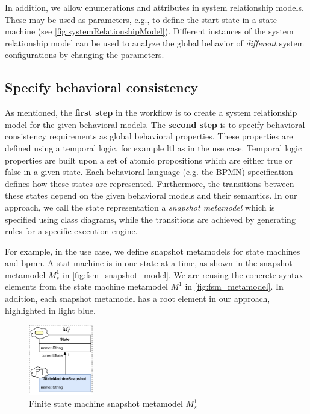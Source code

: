 \documentclass{jot}
\begin{document}
In addition, we allow enumerations and attributes in system relationship models.
These may be used as parameters, e.g., to define the start state in a state machine (see \autoref{fig:systemRelationshipModel}).
Different instances of the system relationship model can be used to analyze the global behavior of \emph{different} system configurations by changing the parameters.


\subsection{Specify behavioral consistency}
As mentioned, the \textbf{first step} in the workflow is to create a system relationship model for the given behavioral models.
The \textbf{second step} is to specify behavioral consistency requirements as global behavioral properties.
These properties are defined using a temporal logic, for example \gls*{ltl} as in the use case.
Temporal logic properties are built upon a set of atomic propositions which are either true or false in a given state.
Each behavioral language (e.g. the BPMN) specification defines how these states are represented.
Furthermore, the transitions between these states depend on the given behavioral models and their semantics.
In our approach, we call the state representation a \emph{snapshot metamodel} which is specified using class diagrams, while the transitions are achieved by generating rules for a specific execution engine.

For example, in the use case, we define snapshot metamodels for state machines and \gls*{bpmn}.
A stat machine is in one state at a time, as shown in the snapshot metamodel $M_s^1$ in \autoref{fig:fsm_snapshot_model}.
We are reusing the concrete syntax elements from the state machine metamodel $M^1$ in \autoref{fig:fsm_metamodel}.
In addition, each snapshot metamodel has a root element in our approach, highlighted in light blue.
\begin{figure}[h]
    \centering
    \includegraphics[width=0.25\textwidth]{figures/state_machine_s_model.pdf}
    \caption{Finite state machine snapshot metamodel $M_s^1$}
    \label{fig:fsm_snapshot_model}
\end{figure}
\end{document}
